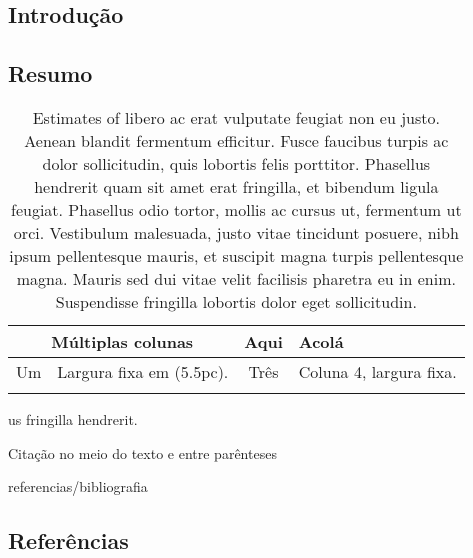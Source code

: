 \begin{btUnit}
\chapter{Introdução}

\section*{Resumo}

\begin{table}
\centering
\caption{Estimates of libero ac erat vulputate feugiat non
  eu justo. Aenean blandit fermentum efficitur. Fusce faucibus turpis
  ac dolor sollicitudin, quis lobortis felis porttitor. Phasellus
  hendrerit quam sit amet erat fringilla, et bibendum ligula feugiat.
  Phasellus odio tortor, mollis ac cursus ut, fermentum ut orci.
  Vestibulum malesuada, justo vitae tincidunt posuere, nibh ipsum
  pellentesque mauris, et suscipit magna turpis pellentesque magna.
  Mauris sed dui vitae velit facilisis pharetra eu in enim.
  Suspendisse fringilla lobortis dolor eget sollicitudin.}
\begin{tabular}{ c p{5.5pc} c p{5.5pc} }
\hline
\multicolumn{2}{c}{Múltiplas colunas} & Aqui & Acolá \\
\hline
Um & \raggedright\arraybackslash Largura fixa em (5.5pc). & Três &
\raggedright\arraybackslash Coluna 4, largura fixa.\\
\hline
\label{Tab:estim}
\end{tabular}
\end{table}
us fringilla hendrerit.

Citação no meio do texto \citet{Casella-Berger2011} e entre parênteses
\citep{Gelman2007}

\begin{btSect}{referencias/bibliografia}
\section*{Referências}
\btPrintCited
\end{btSect}

\end{btUnit}
